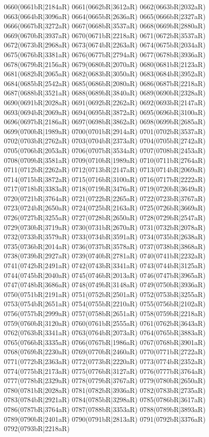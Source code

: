 0660(0661bR|2184aR) 0661(0662bR|3612aR) 0662(0663bR|2032aR) 0663(0664bR|3096aR) 0664(0665bR|2636aR) 0665(0666bR|2327aR) \\0666(0667bR|3272aR) 0667(0668bR|3537aR) 0668(0669bR|2880aR) 0669(0670bR|3937aR) 0670(0671bR|2218aR) 0671(0672bR|3537aR) 0672(0673bR|2968aR) 0673(0674bR|2263aR) 0674(0675bR|2034aR) \\0675(0676bR|3381aR) 0676(0677bR|2794aR) 0677(0678bR|3936aR) 0678(0679bR|2156aR) 0679(0680bR|2070aR) 0680(0681bR|2123aR) 0681(0682bR|2065aR) 0682(0683bR|3050aR) 0683(0684bR|3952aR) \\0684(0685bR|2542aR) 0685(0686bR|2080aR) 0686(0687bR|2218aR) 0687(0688bR|3521aR) 0688(0689bR|3840aR) 0689(0690bR|2328aR) 0690(0691bR|2028aR) 0691(0692bR|2262aR) 0692(0693bR|2147aR) \\0693(0694bR|2069aR) 0694(0695bR|3872aR) 0695(0696bR|3100aR) 0696(0697bR|2186aR) 0697(0698bR|3862aR) 0698(0699bR|2685aR) 0699(0700bR|1989aR) 0700(0701bR|2914aR) 0701(0702bR|3537aR) \\0702(0703bR|2762aR) 0703(0704bR|2373aR) 0704(0705bR|2742aR) 0705(0706bR|2053aR) 0706(0707bR|3534aR) 0707(0708bR|2453aR) 0708(0709bR|3581aR) 0709(0710bR|1989aR) 0710(0711bR|2764aR) \\0711(0712bR|2262aR) 0712(0713bR|2147aR) 0713(0714bR|2069aR) 0714(0715bR|3872aR) 0715(0716bR|3100aR) 0716(0717bR|2222aR) 0717(0718bR|3383aR) 0718(0719bR|3476aR) 0719(0720bR|3649aR) \\0720(0721bR|3764aR) 0721(0722bR|2265aR) 0722(0723bR|3767aR) 0723(0724bR|2650aR) 0724(0725bR|2163aR) 0725(0726bR|3669aR) 0726(0727bR|3255aR) 0727(0728bR|2650aR) 0728(0729bR|2547aR) \\0729(0730bR|3719aR) 0730(0731bR|2670aR) 0731(0732bR|2078aR) 0732(0733bR|3579aR) 0733(0734bR|3591aR) 0734(0735bR|2638aR) 0735(0736bR|2014aR) 0736(0737bR|3578aR) 0737(0738bR|3868aR) \\0738(0739bR|2927aR) 0739(0740bR|2781aR) 0740(0741bR|2232aR) 0741(0742bR|2491aR) 0742(0743bR|3341aR) 0743(0744bR|3125aR) 0744(0745bR|2040aR) 0745(0746bR|2013aR) 0746(0747bR|3965aR) \\0747(0748bR|3686aR) 0748(0749bR|3148aR) 0749(0750bR|3936aR) 0750(0751bR|2191aR) 0751(0752bR|2501aR) 0752(0753bR|3255aR) 0753(0754bR|2651aR) 0754(0755bR|2210aR) 0755(0756bR|2102aR) \\0756(0757bR|2999aR) 0757(0758bR|2651aR) 0758(0759bR|2218aR) 0759(0760bR|3120aR) 0760(0761bR|2555aR) 0761(0762bR|3643aR) 0762(0763bR|3341aR) 0763(0764bR|2073aR) 0764(0765bR|3883aR) \\0765(0766bR|3335aR) 0766(0767bR|1986aR) 0767(0768bR|3901aR) 0768(0769bR|2230aR) 0769(0770bR|2460aR) 0770(0771bR|2722aR) 0771(0772bR|2363aR) 0772(0773bR|2220aR) 0773(0774bR|2352aR) \\0774(0775bR|2173aR) 0775(0776bR|3127aR) 0776(0777bR|3764aR) 0777(0778bR|2329aR) 0778(0779bR|3767aR) 0779(0780bR|2650aR) 0780(0781bR|2028aR) 0781(0782bR|3936aR) 0782(0783bR|2735aR) \\0783(0784bR|2921aR) 0784(0785bR|3298aR) 0785(0786bR|3617aR) 0786(0787bR|3764aR) 0787(0788bR|3353aR) 0788(0789bR|3893aR) 0789(0790bR|2401aR) 0790(0791bR|2813aR) 0791(0792bR|3376aR) \\0792(0793bR|2218aR) 